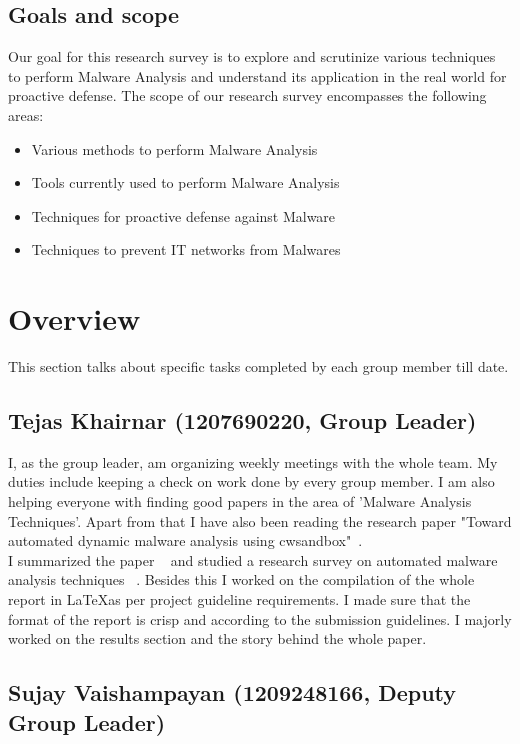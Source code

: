 \documentclass[11pt]{article}
\begin{document}
	\subsection{Goals and scope}
	Our goal for this research survey is to explore and scrutinize various techniques to perform Malware Analysis and understand its application in the real world for proactive defense.
	The scope of our research survey encompasses the following areas:
	\begin{itemize}[noitemsep]
		\item{Various methods to perform Malware Analysis}
		\item{Tools currently used to perform Malware Analysis} 
		\item{Techniques for proactive defense against Malware}
		\item{Techniques to prevent IT networks from Malwares}
	\end{itemize}


\section{Overview}
This section talks about specific tasks completed by each group member till date.
\subsection{Tejas Khairnar (1207690220, Group Leader)}
I, as the group leader, am organizing weekly meetings with the whole team. My duties include keeping a check on work done by every group member.
I am also helping everyone with finding good papers in the area of 'Malware Analysis Techniques'. Apart from that I have also been reading the research paper "Toward automated dynamic malware analysis using cwsandbox"~\cite{willems2007toward}. \\
I summarized the paper ~\cite{willems2007toward} and studied a research survey on automated malware analysis techniques ~\cite{egele2012survey}. Besides this I worked on the compilation of the whole report in \LaTeX as per project guideline requirements. I made sure that the format of the report is crisp and according to the submission guidelines. I majorly worked on the results section and the story behind the whole paper. 

\subsection{Sujay Vaishampayan (1209248166, Deputy Group Leader)}
		
\end{document}
